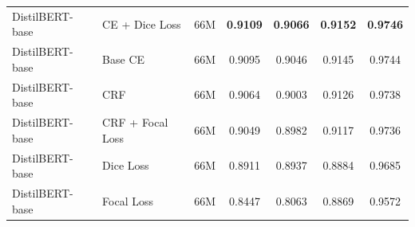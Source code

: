 \begin{table}[htbp]
\begin{tabular}{l l c c c c c}
        \hline
        DistilBERT-base & CE + Dice Loss & 66M & \textbf{0.9109} & \textbf{0.9066} & \textbf{0.9152} & \textbf{0.9746} \\
        DistilBERT-base & Base CE & 66M & 0.9095 & 0.9046 & 0.9145 & 0.9744 \\
        DistilBERT-base & CRF & 66M & 0.9064 & 0.9003 & 0.9126 & 0.9738 \\
        DistilBERT-base & CRF + Focal Loss & 66M & 0.9049 & 0.8982 & 0.9117 & 0.9736 \\
        DistilBERT-base & Dice Loss & 66M & 0.8911 & 0.8937 & 0.8884 & 0.9685 \\
        DistilBERT-base & Focal Loss & 66M & 0.8447 & 0.8063 & 0.8869 & 0.9572 \\
        \hline
    \end{tabular}
    \label{tab:comprehensive_all_models}
\end{table}